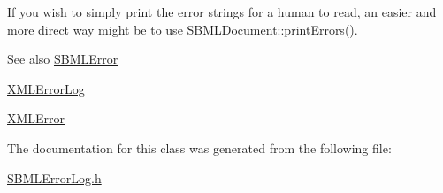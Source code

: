 If you wish to simply print the error strings for a human to read, an easier and more direct way might be to use S\+B\+M\+L\+Document\+::print\+Errors().

\begin{DoxySeeAlso}{See also}
\hyperlink{class_s_b_m_l_error}{S\+B\+M\+L\+Error} 

\hyperlink{class_x_m_l_error_log}{X\+M\+L\+Error\+Log} 

\hyperlink{class_x_m_l_error}{X\+M\+L\+Error} 
\end{DoxySeeAlso}


The documentation for this class was generated from the following file\+:\begin{DoxyCompactItemize}
\item 
\hyperlink{_s_b_m_l_error_log_8h}{S\+B\+M\+L\+Error\+Log.\+h}\end{DoxyCompactItemize}
